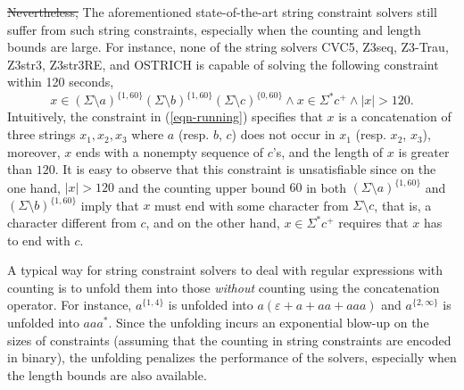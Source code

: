 \sout{Nevertheless, }The aforementioned state-of-the-art string constraint solvers still suffer from such string constraints, especially when the counting and length bounds are large. For instance, none of the string solvers CVC5, Z3seq, Z3-Trau, Z3str3, Z3str3RE, and OSTRICH is capable of solving the following constraint within 120 seconds,
%
\begin{equation}\label{eqn-running}
x \in (\Sigma \setminus a)^{\{1, 60\}} (\Sigma \setminus b)^{\{1, 60\}} (\Sigma \setminus c)^{\{0, 60\}} \wedge x \in \Sigma^* c^+ \wedge |x| > 120.
\end{equation}
Intuitively, the constraint in (\ref{eqn-running}) specifies that $x$ is a concatenation of three strings $x_1, x_2, x_3$ where $a$ (resp. $b$, $c$) does not occur in $x_1$ (resp. $x_2$, $x_3$), moreover, $x$ ends with a nonempty sequence of $c$'s, and the length of $x$ is greater than $120$. It is easy to observe that this constraint is unsatisfiable since on the one hand, $|x| > 120$ and the counting upper bound $60$ in both $(\Sigma \setminus a)^{\{1, 60\}}$ and $(\Sigma \setminus b)^{\{1, 60\}}$ imply that $x$ must end with some character from $\Sigma \setminus c$, that is, a character different from $c$, and on the other hand, $x \in \Sigma^*c^+$ requires that $x$ has to end with $c$.

A typical way for string constraint solvers to deal with regular expressions with counting is to unfold them into those \emph{without} counting using the concatenation operator. For instance, $a^{\{1, 4\}}$ is unfolded into $a(\varepsilon + a + aa + aaa)$ and $a^{\{2,\infty\}}$ is unfolded into $aaa^{*}$. Since the unfolding incurs an exponential blow-up on the sizes of constraints (assuming that the counting in string constraints are encoded in binary), the unfolding penalizes the performance of the solvers, especially when the length bounds are also available.

